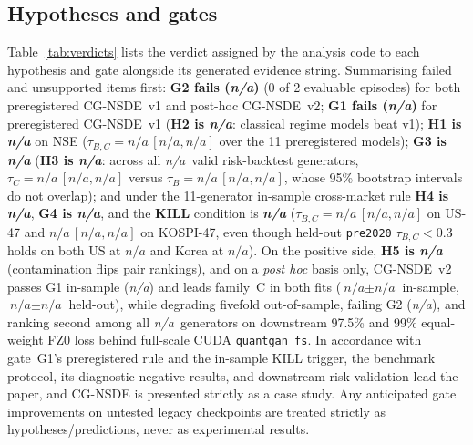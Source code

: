 \documentclass[journal]{IEEEtran}
\newcommand{\pendingnum}{\textit{n/a}}
\providecommand{\nRiskGenerators}{\pendingnum}
\providecommand{\tauBCnseFullPrereg}{\pendingnum}
\providecommand{\tauBCnseFullPreregLo}{\pendingnum}
\providecommand{\tauBCnseFullPreregHi}{\pendingnum}
\providecommand{\tauBCusFullPrereg}{\pendingnum}
\providecommand{\tauBCusFullPreregLo}{\pendingnum}
\providecommand{\tauBCusFullPreregHi}{\pendingnum}
\providecommand{\tauBCusHeldPrereg}{\pendingnum}
\providecommand{\tauBCkrFullPrereg}{\pendingnum}
\providecommand{\tauBCkrFullPreregLo}{\pendingnum}
\providecommand{\tauBCkrFullPreregHi}{\pendingnum}
\providecommand{\tauBCkrHeldPrereg}{\pendingnum}
\providecommand{\tauRiskB}{\pendingnum}
\providecommand{\tauRiskBLo}{\pendingnum}
\providecommand{\tauRiskBHi}{\pendingnum}
\providecommand{\tauRiskC}{\pendingnum}
\providecommand{\tauRiskCLo}{\pendingnum}
\providecommand{\tauRiskCHi}{\pendingnum}
\providecommand{\scoreCCgnsdeTwoFull}{\pendingnum}
\providecommand{\scoreCCgnsdeTwoFullSd}{\pendingnum}
\providecommand{\scoreCCgnsdeTwoHeld}{\pendingnum}
\providecommand{\scoreCCgnsdeTwoHeldSd}{\pendingnum}
\providecommand{\verdictHOne}{\pendingnum}
\providecommand{\verdictHTwo}{\pendingnum}
\providecommand{\verdictHThree}{\pendingnum}
\providecommand{\verdictHFour}{\pendingnum}
\providecommand{\verdictHFive}{\pendingnum}
\providecommand{\verdictGOne}{\pendingnum}
\providecommand{\verdictGTwo}{\pendingnum}
\providecommand{\verdictGThree}{\pendingnum}
\providecommand{\verdictGFour}{\pendingnum}
\providecommand{\verdictGOnevTwoposthoc}{\pendingnum}
\providecommand{\verdictGTwovTwoposthoc}{\pendingnum}
\providecommand{\verdictKILL}{\pendingnum}
\newcommand{\maybetable}[1]{\IfFileExists{#1}{}{\textit{(pending)}}}
\begin{document}
\begin{table}[t]
\caption{Contamination sensitivity: pair-order flips across contaminated copies of the NSE-47 panel. A pair
flip means that two generators swap rank on one metric relative to the clean panel.}
\label{tab:contam}
\centering
\footnotesize
\maybetable{tables/t7_contamination.tex}
\end{table}

\subsection{Hypotheses and gates}
Table~\ref{tab:verdicts} lists the verdict assigned by the analysis code to each hypothesis and gate alongside
its generated evidence string. Summarising failed and unsupported items first: \textbf{G2 fails
(\verdictGTwo)} (0 of 2 evaluable episodes) for both preregistered CG-NSDE~v1 and post-hoc CG-NSDE~v2;
\textbf{G1 fails (\verdictGOne)} for preregistered CG-NSDE~v1 (\textbf{H2 is \verdictHTwo}: classical regime
models beat v1); \textbf{H1 is \verdictHOne} on NSE ($\tau_{B,C} =
\tauBCnseFullPrereg\,[\tauBCnseFullPreregLo,\tauBCnseFullPreregHi]$ over the 11 preregistered models);
\textbf{G3 is \verdictGThree} (\textbf{H3 is \verdictHThree}: across all \nRiskGenerators\ valid
risk-backtest generators, $\tau_C = \tauRiskC\,[\tauRiskCLo,\tauRiskCHi]$ versus $\tau_B =
\tauRiskB\,[\tauRiskBLo,\tauRiskBHi]$, whose 95\% bootstrap intervals do not overlap); and under the
11-generator in-sample cross-market rule \textbf{H4 is \verdictHFour}, \textbf{G4 is \verdictGFour}, and the
\textbf{KILL} condition is \textbf{\verdictKILL} ($\tau_{B,C} =
\tauBCusFullPrereg\,[\tauBCusFullPreregLo,\tauBCusFullPreregHi]$ on US-47 and
$\tauBCkrFullPrereg\,[\tauBCkrFullPreregLo,\tauBCkrFullPreregHi]$ on KOSPI-47, even though held-out
\texttt{pre2020} $\tau_{B,C} < 0.3$ holds on both US at $\tauBCusHeldPrereg$ and Korea at $\tauBCkrHeldPrereg$).
On the positive side, \textbf{H5 is \verdictHFive} (contamination flips pair rankings), and on a \emph{post
hoc} basis only, CG-NSDE~v2 passes G1 in-sample (\verdictGOnevTwoposthoc) and leads family~C in both fits
($\scoreCCgnsdeTwoFull \pm \scoreCCgnsdeTwoFullSd$ in-sample, $\scoreCCgnsdeTwoHeld \pm
\scoreCCgnsdeTwoHeldSd$ held-out), while degrading fivefold out-of-sample, failing G2 (\verdictGTwovTwoposthoc),
and ranking second among all \nRiskGenerators\ generators on downstream 97.5\% and 99\% equal-weight FZ0 loss
behind full-scale CUDA \texttt{quantgan\_fs}. In accordance with gate~G1's preregistered rule and the in-sample
KILL trigger, the benchmark protocol, its diagnostic negative results, and downstream risk validation lead the
paper, and CG-NSDE is presented strictly as a case study. Any anticipated gate improvements on untested legacy
checkpoints are treated strictly as hypotheses/predictions, never as experimental results.
\end{document}
